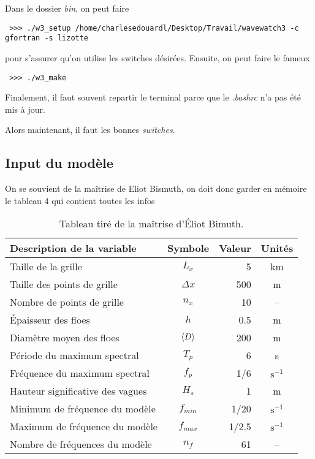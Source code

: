 \documentclass[10pt]{article}
\numberwithin{equation}{section}
\begin{document}
Dans le dossier \emph{bin}, on peut faire
\begin{verbatim}
 >>> ./w3_setup /home/charlesedouardl/Desktop/Travail/wavewatch3 -c gfortran -s lizotte
\end{verbatim}
pour s'assurer qu'on utilise les switches désirées. Ensuite, on peut faire le fameux
\begin{verbatim}
 >>> ./w3_make
\end{verbatim}
Finalement, il faut souvent repartir le terminal parce que le \emph{.bashrc} n'a pas été mis à jour.\bigskip

Alors maintenant, il faut les bonnes \emph{switches}.



\newpage
\subsection{Input du modèle}
\label{sec:orgc98c3a5}

On se souvient de la maîtrise de Eliot Bismuth, on doit donc garder en mémoire le tableau 4 qui contient toutes les infos

\begin{table}[!h]
\caption{Tableau tiré de la maîtrise d'Éliot Bimuth.}
\centering
\begin{tabular}{lcrc}
\hline
\hline
Description de la variable & Symbole & Valeur & Unités\\
\hline
Taille de la grille & \(L_x\) & 5 & km\\
Taille des points de grille & \(\Delta x\) & 500 & m\\
Nombre de points de grille & \(n_x\) & 10 & --\\
Épaisseur des floes & \(h\) & 0.5 & m\\
Diamètre moyen des floes & \(\expval{D}\) & 200 & m\\
Période du maximum spectral & \(T_p\) & 6 & s\\
Fréquence du maximum spectral & \(f_p\) & 1/6 & \(\mathrm{s}^{-1}\)\\
Hauteur significative des vagues & \(H_s\) & 1 & m\\
Minimum de fréquence du modèle & \(f_{min}\) & 1/20 & \(\mathrm{s}^{-1}\)\\
Maximum de fréquence du modèle & \(f_{max}\) & 1/2.5 & \(\mathrm{s}^{-1}\)\\
Nombre de fréquences du modèle & \(n_f\) & 61 & --\\
\hline
\end{tabular}
\end{table}
\end{document}
